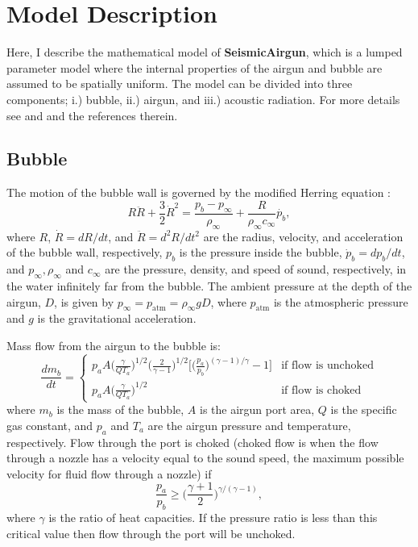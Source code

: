 \documentclass[10pt]{article}
\begin{document}
\section{Model Description}
Here, I describe the mathematical model of {\bf SeismicAirgun}, which is a lumped parameter model where the internal properties of the airgun and bubble are assumed to be spatially uniform. The model can be divided into three components; i.) bubble, ii.) airgun, and iii.) acoustic radiation. For more details see \citet{Chelminski2019} and \citet{Watson2016} and the references therein. 

\subsection{Bubble}
The motion of the bubble wall is governed by the modified Herring equation \citep{Herring1941,Cole1948,Vokurka1986}:
\begin{equation}
R \ddot{R}+ \frac{3}{2} \dot{R}^2 = \frac{p_b - p_\infty}{\rho_\infty} + \frac{R}{\rho_\infty c_\infty} \dot{p_b},
\label{eq:modified herring}
\end{equation}
where $R$, $\dot{R}=dR/dt$, and $\ddot{R}=d^2R/dt^2$ are the radius, velocity, and acceleration of the bubble wall, respectively, $p_b$ is the pressure inside the bubble, $\dot{p}_b = dp_b/dt$, and $p_\infty, \rho_\infty$ and $c_\infty$ are the pressure, density, and speed of sound, respectively, in the water infinitely far from the bubble. The ambient pressure at the depth of the airgun, $D$, is given by $p_\infty = p_\text{atm} = \rho_\infty g D$, where $p_\text{atm}$ is the atmospheric pressure and $g$ is the gravitational acceleration. 

Mass flow from the airgun to the bubble is:
\begin{equation}
\frac{dm_b}{dt} = 
  \begin{cases} 
   p_a A \big( \frac{\gamma}{QT_a} \big)^{1/2} \big( \frac{2}{\gamma-1}\big)^{1/2} \bigg[ \big( \frac{p_a}{p_b}\big)^{(\gamma-1)/\gamma} - 1\bigg] & \text{if flow is unchoked}  \\
   p_a A \big( \frac{\gamma}{QT_a} \big)^{1/2}       & \text{if flow is choked} 
  \end{cases}
\end{equation}
where $m_b$ is the mass of the bubble, $A$ is the airgun port area, $Q$ is the specific gas constant, and $p_a$ and $T_a$ are the airgun pressure and temperature, respectively. Flow through the port is choked (choked flow is when the flow through a nozzle has a velocity equal to the sound speed, the maximum possible velocity for fluid flow through a nozzle) if \citep{Babu2014}
\begin{equation}
\frac{p_a}{p_b} \geq \bigg( \frac{\gamma+1}{2}\bigg)^{\gamma/(\gamma-1)},
\end{equation}
where $\gamma$ is the ratio of heat capacities. If the pressure ratio is less than this critical value then flow through the port will be unchoked. 
\end{document}
